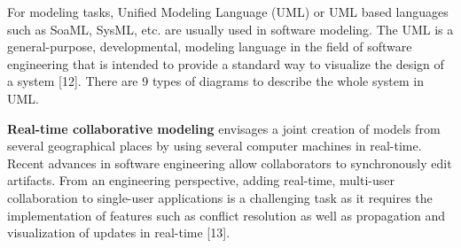 For modeling tasks, Unified Modeling Language (UML) or UML based languages such as SoaML, SysML, etc. are usually used in software modeling. The UML is a general-purpose, developmental, modeling language in the field of software engineering that is intended to provide a standard way to visualize the design of a system [12]. There are 9 types of diagrams to describe the whole system in UML. 

\textbf{Real-time collaborative modeling} envisages a joint creation of models from several geographical places by using several computer machines in real-time. Recent advances in software engineering allow collaborators to synchronously edit artifacts. From an engineering perspective, adding real-time, multi-user collaboration to single-user applications is a challenging task as it requires the implementation of features such as conflict resolution as well as propagation and visualization of updates in real-time [13]. 
